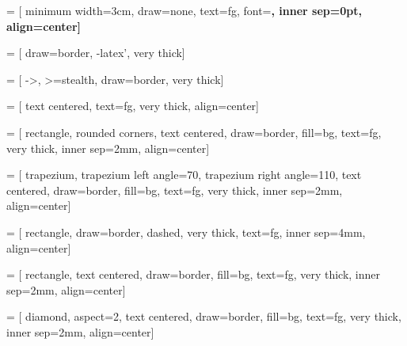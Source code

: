 \usepackage{tikz} %
\usetikzlibrary{arrows, backgrounds, calc, fit, math, mindmap, positioning, shapes, shapes.geometric, tikzmark}


\newcommand{\drawhexagon}[5]{
    \node[rounded corners, inner sep=0, ultra thick, regular polygon, regular polygon sides=6, minimum size=#3, rotate=#4, #5] at (#2) {#1}
}

\newcommand{\drawtext}[5]{
    \node[left, bg, rounded corners, minimum width=\paperwidth, minimum height=#3, text width=\paperwidth, rotate=#4, #5] at (#2){#1}
}

\newcommand\pentagonvertex[5]{
    ({#1 + #3*cos(72*#5 + #4)},%
     {#2 + #3*sin(72*#5 + #4)})%
}


 = [
    minimum width=3cm,
    draw=none,
    text=fg,
    font=\bf,
    inner sep=0pt,
    align=center]

 = [
    draw=border,
    -latex',
    very thick]

 = [
    ->,
    >=stealth,
    draw=border,
    very thick]

 = [
    text centered,
    text=fg,
    very thick,
    align=center]

 = [
    rectangle,
    rounded corners,
    text centered,
    draw=border,
    fill=bg,
    text=fg,
    very thick,
    inner sep=2mm,
    align=center]

 = [
    trapezium,
    trapezium left angle=70,
    trapezium right angle=110,
    text centered,
    draw=border,
    fill=bg,
    text=fg,
    very thick,
    inner sep=2mm,
    align=center]

 = [
    rectangle,
    draw=border,
    dashed,
    very thick,
    text=fg,
    inner sep=4mm,
    align=center]

 = [
    rectangle,
    text centered,
    draw=border,
    fill=bg,
    text=fg,
    very thick,
    inner sep=2mm,
    align=center]

 = [
    diamond,
    aspect=2,
    text centered,
    draw=border,
    fill=bg,
    text=fg,
    very thick,
    inner sep=2mm,
    align=center]
